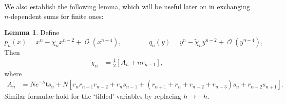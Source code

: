 \documentclass[usenames,dvipsnames]{article}
\theoremstyle{definition}
\newtheorem{lemma}{Lemma}[section]
\DeclareMathOperator{\OO}{\mathcal{O}}
\numberwithin{equation}{section}
\numberwithin{figure}{section}
\begin{document}
    We also establish the following lemma, which will be useful later on in exchanging $n$-dependent sums for finite ones:
        \begin{lemma}\label{lemmaA3}
            Define
            \begin{equation*}
                p_n(x) = x^n - \chi_nx^{n-2} + \OO(x^{n-4}),\qquad\qquad q_n(y) = y^n - \tilde{\chi}_ny^{n-2} + \OO(y^{n-4}),
            \end{equation*}
        Then
            \begin{align}
            \chi_{n} &= \frac{1}{2}\left[A_{n}+nr_{n-1}\right],
        \end{align}
    where 
        \begin{align}
            A_n &= Ne^{-h}\mathfrak{t}s_n+N[r_nr_{n-1}r_{n-2} +r_ns_{n-1} + (r_{n+1}+r_{n}+r_{n-2}+r_{n-3})s_n + r_{n-2}s_{n+1}].
        \end{align}
    Similar formulae hold for the `tilded' variables by replacing $h\to -h$.
        \end{lemma}
\end{document}
